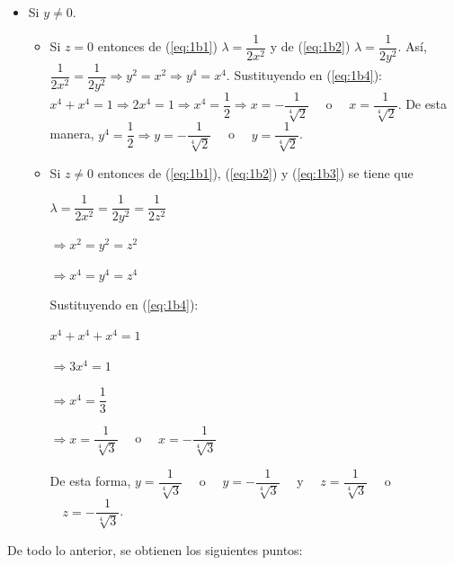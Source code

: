 \documentclass[fleqn, 12pt]{article}
\begin{document}
\begin{list}{\bfseries Ejercicio}{ \addtolength{\itemindent}{-1mm}%
    \addtolength{\labelsep}{-1mm}%
    \addtolength{\leftmargin}{-1cm}%
    \addtolength{\labelwidth}{-1cm} }
\begin{enumerate}[a)]
\begin{itemize}
\begin{itemize}
                \item Si $ y \neq 0 $.
                \begin{itemize}
                    \item Si $ z = 0 $ entonces de (\ref{eq:1b1}) $ \lambda = \dfrac{1}{2x^2} $ y de (\ref{eq:1b2}) $ \lambda = \dfrac{1}{2y^2} $. Así, $ \dfrac{1}{2x^2} = \dfrac{1}{2y^2} \Longrightarrow y^2 = x^2 \Longrightarrow y^4 = x^4 $. Sustituyendo en (\ref{eq:1b4}): $ x^4 + x^4 = 1 \Longrightarrow 2x^4 = 1 \Longrightarrow x^4 = \dfrac{1}{2} \Longrightarrow x = - \dfrac{1}{\sqrt[4]{2}} \quad $ o $ \quad x = \dfrac{1}{\sqrt[4]{2}} $. De esta manera, $ y^4 = \dfrac{1}{2} \Longrightarrow y = - \dfrac{1}{\sqrt[4]{2}} \quad $ o $ \quad y = \dfrac{1}{\sqrt[4]{2}} $.
                    \item Si $ z \neq 0 $ entonces de (\ref{eq:1b1}), (\ref{eq:1b2}) y (\ref{eq:1b3}) se tiene que 
                    
                    $ \lambda = \dfrac{1}{2x^2} = \dfrac{1}{2y^2} = \dfrac{1}{2z^2} $

                    $ \Longrightarrow x^2 = y^2 = z^2 $

                    $ \Longrightarrow x^4 = y^4 = z^4 $

                    Sustituyendo en (\ref{eq:1b4}):

                    $ x^4 + x^4 + x^4 = 1 $

                    $ \Longrightarrow 3x^4 = 1 $

                    $ \Longrightarrow x^4 = \dfrac{1}{3} $

                    $ \Longrightarrow x = \dfrac{1}{\sqrt[4]{3}} \quad $ o $ \quad x = - \dfrac{1}{\sqrt[4]{3}} $

                    De esta forma, $ y = \dfrac{1}{\sqrt[4]{3}} \quad $ o $ \quad y = - \dfrac{1}{\sqrt[4]{3}} \quad $ y $ \quad z = \dfrac{1}{\sqrt[4]{3}} \quad $ o $ \quad z = - \dfrac{1}{\sqrt[4]{3}} $.
                \end{itemize}
            \end{itemize}   
        \end{itemize}

        De todo lo anterior, se obtienen los siguientes puntos: 
                    

\end{enumerate}
\end{list}
\end{document}
